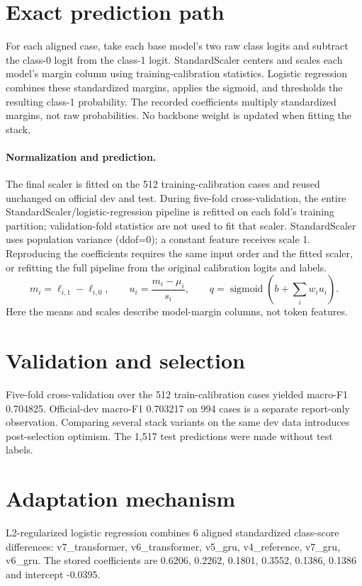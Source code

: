 \documentclass[11pt,a4paper]{article}
\begin{document}
\section{Exact prediction path}
For each aligned case, take each base model's two raw class logits and subtract the class-0 logit from the class-1 logit. StandardScaler centers and scales each model's margin column using training-calibration statistics. Logistic regression combines these standardized margins, applies the sigmoid, and thresholds the resulting class-1 probability. The recorded coefficients multiply standardized margins, not raw probabilities. No backbone weight is updated when fitting the stack.
\paragraph{Normalization and prediction.} The final scaler is fitted on the 512 training-calibration cases and reused unchanged on official dev and test. During five-fold cross-validation, the entire StandardScaler/logistic-regression pipeline is refitted on each fold's training partition; validation-fold statistics are not used to fit that scaler. StandardScaler uses population variance (ddof=0); a constant feature receives scale 1. Reproducing the coefficients requires the same input order and the fitted scaler, or refitting the full pipeline from the original calibration logits and labels.
\[ m_i=\ell_{i,1}-\ell_{i,0},\qquad u_i=\frac{m_i-\mu_i}{s_i},\qquad q=\operatorname{sigmoid}\!\left(b+\sum_i w_i u_i\right). \]
Here the means and scales describe model-margin columns, not token features.

\section{Validation and selection}
Five-fold cross-validation over the 512 train-calibration cases yielded macro-F1 0.704825. Official-dev macro-F1 0.703217 on 994 cases is a separate report-only observation. Comparing several stack variants on the same dev data introduces post-selection optimism. The 1,517 test predictions were made without test labels.
\section{Adaptation mechanism}
L2-regularized logistic regression combines 6 aligned standardized class-score differences: v7\_transformer, v6\_transformer, v5\_gru, v4\_reference, v7\_gru, v6\_gru. The stored coefficients are 0.6206, 0.2262, 0.1801, 0.3552, 0.1386, 0.1386 and intercept -0.0395.
\end{document}
